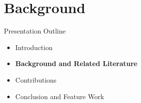 \documentclass{beamer}
\begin{document}
\section{Background}
\begin{frame}{Presentation Outline}
    \begin{itemize}
     	\itemsep=.5cm
    	\item Introduction
        \item {\bf Background and Related Literature}
    	\item Contributions
    	\item Conclusion and Feature Work
    \end{itemize}
\end{frame}


\end{document}
